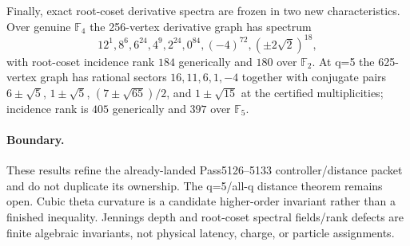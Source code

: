 Finally, exact root-coset derivative spectra are frozen in two new characteristics.  Over genuine $\mathbb F_4$ the 256-vertex derivative graph has spectrum
\[
12^1,8^6,6^{24},4^9,2^{24},0^{84},(-4)^{72},(\pm2\sqrt2)^{18},
\]
with root-coset incidence rank $184$ generically and $180$ over $\mathbb F_2$.  At q=5 the 625-vertex graph has rational sectors $16,11,6,1,-4$ together with conjugate pairs $6\pm\sqrt5$, $1\pm\sqrt5$, $(7\pm\sqrt{65})/2$, and $1\pm\sqrt{15}$ at the certified multiplicities; incidence rank is $405$ generically and $397$ over $\mathbb F_5$.

\paragraph{Boundary.}
These results refine the already-landed Pass5126--5133 controller/distance packet and do not duplicate its ownership.  The q=5/all-q distance theorem remains open.  Cubic theta curvature is a candidate higher-order invariant rather than a finished inequality.  Jennings depth and root-coset spectral fields/rank defects are finite algebraic invariants, not physical latency, charge, or particle assignments.
\fi
